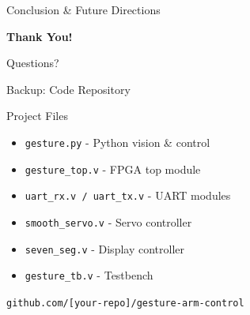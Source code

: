 \documentclass[aspectratio=169]{beamer}
\begin{document}
\begin{frame}{Conclusion \& Future Directions}
\vspace{0.5cm}
\begin{center}
\Large \textbf{Thank You!} \faSmile

\normalsize
Questions? \faQuestionCircle
\end{center}
\end{frame}

\appendix

\begin{frame}[fragile]{Backup: Code Repository}
\begin{center}
\begin{block}{Project Files}
\begin{itemize}
    \item \texttt{gesture.py} - Python vision \& control
    \item \texttt{gesture\_top.v} - FPGA top module
    \item \texttt{uart\_rx.v / uart\_tx.v} - UART modules
    \item \texttt{smooth\_servo.v} - Servo controller
    \item \texttt{seven\_seg.v} - Display controller
    \item \texttt{gesture\_tb.v} - Testbench
\end{itemize}
\end{block}

\vspace{0.5cm}


\vspace{0.3cm}
\texttt{github.com/[your-repo]/gesture-arm-control}
\end{center}
\end{frame}
\end{document}
